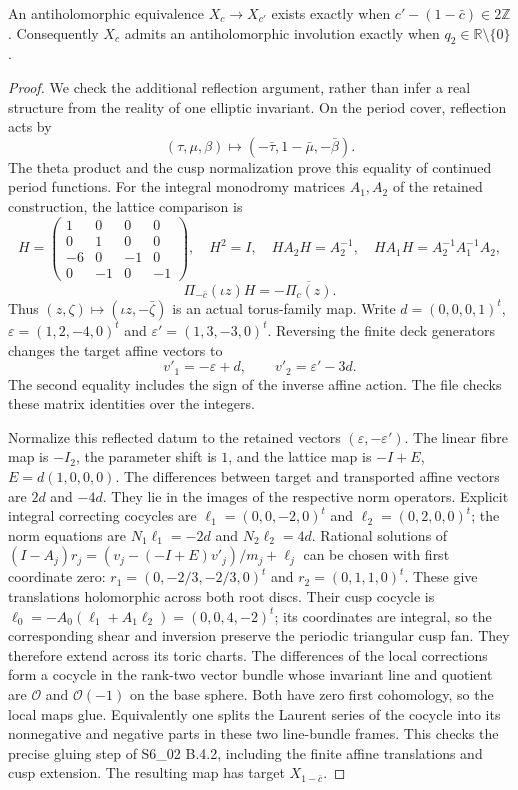 \begin{statement}
An antiholomorphic equivalence $X_c\to X_{c'}$ exists exactly when
$c'-(1-\bar c)\in2\mathbb Z$. Consequently $X_c$ admits an
antiholomorphic involution exactly when $q_2\in\mathbb R\setminus\{0\}$.
\end{statement}
\begin{proof}
We check the additional reflection argument, rather than infer a real
structure from the reality of one elliptic invariant. On the period
cover, reflection acts by
\[
 (\tau,\mu,\beta)\longmapsto(-\bar\tau,1-\bar\mu,-\bar\beta).
\]
The theta product and the cusp normalization prove this equality of
continued period functions. For the integral monodromy matrices
$A_1,A_2$ of the retained construction, the lattice comparison is
\[
 H=\begin{pmatrix}1&0&0&0\\0&1&0&0\\-6&0&-1&0\\0&-1&0&-1\end{pmatrix},
 \quad H^2=I,\quad HA_2H=A_2^{-1},\quad
 HA_1H=A_2^{-1}A_1^{-1}A_2,
\]
\[
 \Pi_{-\bar c}(\iota z)H=-\overline{\Pi_c(z)}.
\]
Thus $(z,\zeta)\mapsto(\iota z,-\bar\zeta)$ is an actual torus-family
map. Write $d=(0,0,0,1)^t$, $\varepsilon=(1,2,-4,0)^t$ and
$\varepsilon'=(1,3,-3,0)^t$. Reversing the finite deck generators
changes the target affine vectors to
\[
 v'_1=-\varepsilon+d,\qquad v'_2=\varepsilon'-3d.
\]
The second equality includes the sign of the inverse affine action.
The file  checks these matrix identities
over the integers.

Normalize this reflected datum to the retained vectors
$(\varepsilon,-\varepsilon')$. The linear fibre map is $-I_2$, the
parameter shift is $1$, and the lattice map is $-I+E$,
$E=d(1,0,0,0)$. The differences between target and transported affine
vectors are $2d$ and $-4d$. They lie in the images of the respective
norm operators. Explicit integral correcting cocycles are
$\ell_1=(0,0,-2,0)^t$ and $\ell_2=(0,2,0,0)^t$; the norm equations
are $N_1\ell_1=-2d$ and $N_2\ell_2=4d$. Rational solutions of
$(I-A_j)r_j=(v_j-(-I+E)v'_j)/m_j+\ell_j$ can be chosen with first
coordinate zero: $r_1=(0,-2/3,-2/3,0)^t$ and
$r_2=(0,1,1,0)^t$. These give translations holomorphic across both
root discs. Their cusp cocycle is
$\ell_0=-A_0(\ell_1+A_1\ell_2)=(0,0,4,-2)^t$; its coordinates are
integral, so the corresponding shear and inversion preserve the
periodic triangular cusp fan. They therefore extend across its toric
charts. The differences of the local corrections form a cocycle in
the rank-two vector bundle whose invariant line and quotient are
$\mathcal O$ and $\mathcal O(-1)$ on the base sphere. Both have zero
first cohomology, so the local maps glue. Equivalently one splits the
Laurent series of the cocycle into its nonnegative and negative
parts in these two line-bundle frames. This checks the precise
gluing step of S6\_02 B.4.2, including the finite affine translations
and cusp extension. The resulting map has target $X_{1-\bar c}$.


\end{proof}
